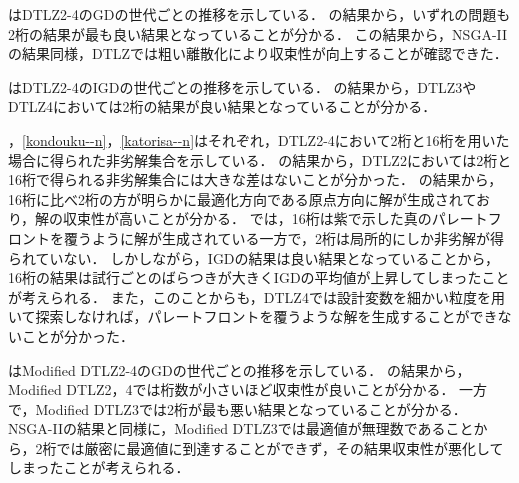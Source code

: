 \documentclass[../main/main]{subfiles}
\begin{document}
はDTLZ2-4のGDの世代ごとの推移を示している．
の結果から，いずれの問題も2桁の結果が最も良い結果となっていることが分かる．
この結果から，NSGA-IIの結果同様，DTLZでは粗い離散化により収束性が向上することが確認できた．

はDTLZ2-4のIGDの世代ごとの推移を示している．
の結果から，DTLZ3やDTLZ4においては2桁の結果が良い結果となっていることが分かる．

，\ref{kondouku--n}，\ref{katorisa--n}はそれぞれ，DTLZ2-4において2桁と16桁を用いた場合に得られた非劣解集合を示している．
の結果から，DTLZ2においては2桁と16桁で得られる非劣解集合には大きな差はないことが分かった．
の結果から，16桁に比べ2桁の方が明らかに最適化方向である原点方向に解が生成されており，解の収束性が高いことが分かる．
では，16桁は紫で示した真のパレートフロントを覆うように解が生成されている一方で，2桁は局所的にしか非劣解が得られていない．
しかしながら，IGDの結果は良い結果となっていることから，16桁の結果は試行ごとのばらつきが大きくIGDの平均値が上昇してしまったことが考えられる．
また，このことからも，DTLZ4では設計変数を細かい粒度を用いて探索しなければ，パレートフロントを覆うような解を生成することができないことが分かった．

はModified DTLZ2-4のGDの世代ごとの推移を示している．
の結果から，Modified DTLZ2，4では桁数が小さいほど収束性が良いことが分かる．
一方で，Modified DTLZ3では2桁が最も悪い結果となっていることが分かる．
NSGA-IIの結果と同様に，Modified DTLZ3では最適値が無理数であることから，2桁では厳密に最適値に到達することができず，その結果収束性が悪化してしまったことが考えられる．
\end{document}
